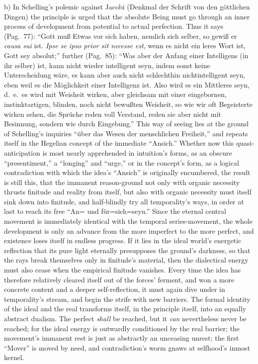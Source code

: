\documentclass[12pt]{book}
\begin{document}
b) In Schelling's polemic against Jacobi (Denkmal der Schrift von den
göttlichen Dingen) the principle is urged that the absolute Being must go
through an inner process of development from potential to actual
perfection. Thus it says (Pag.\ 77): ``Gott muß Etwas vor sich haben,
nemlich sich selber, so gewiß er \textit{causa sui} ist. \textit{Ipse se
ipso prior sit necesse est}, wenn es nicht ein leres Wort ist, Gott sey
absolut;'' further (Pag.\ 85): ``Was aber der Anfang einer Intelligens (in
ihr selber) ist, kann nicht wieder intelligent seyn, indem sonst keine
Unterscheidung wäre, es kann aber auch nicht schlechthin nichtintelligent
seyn, eben weil es die Möglichkeit einer Intelligenz ist. Also wird es ein
Mittleres seyn, d.\ e.\ es wird mit Weisheit wirken, aber gleichsam mit
einer eingebornen, instinktartigen, blinden, noch nicht bewußten Weisheit,
so wie wir oft Begeisterte wirken sehen, die Sprüche reden voll Verstand,
reden sie aber nicht mit Besinnung, sondern wie durch Eingebung.'' This way
of seeing lies at the ground of Schelling's inquiries ``über das Wesen der
menschlichen Freiheit,'' and repeats itself in the Hegelian concept of the
immediate ``Ansich.'' Whether now this quasi-anticipation is most nearly
apprehended in intuition's forms, as an obscure ``presentiment,'' a
``longing'' and ``urge,'' or in the concept's form, as a logical
contradiction with which the idea's ``Ansich'' is originally encumbered, the
result is still this, that the immanent reason-ground not only with organic
necessity thrusts finitude and reality from itself, but also with organic
necessity must itself sink down into finitude, and half-blindly try all
temporality's ways, in order at last to reach its free ``An= und
für=sich=seyn.'' Since the eternal central movement is immediately identical
with the temporal series-movement, the whole development is only an advance
from the more imperfect to the more perfect, and existence loses itself in
endless progress. If it lies in the ideal world's energetic reflection that
its pure light eternally presupposes the ground's darkness, so that the rays
break themselves only in finitude's material, then the dialectical energy
must also cease when the empirical finitude vanishes. Every time the idea
has therefore relatively cleared itself out of the forces' ferment, and won
a more concrete content and a deeper self-reflection, it must again dive
under in temporality's stream, and begin the strife with new barriers. The
formal identity of the ideal and the real transforms itself, in the
principle itself, into an equally abstract dualism. The perfect \emph{shall}
be reached, but it \emph{can} nevertheless never be reached; for the ideal
energy is outwardly conditioned by the real barrier; the movement's immanent
rest is just as abstractly an unceasing unrest; the first ``Mover'' is moved
by need, and contradiction's worm gnaws at selfhood's inmost kernel.
\end{document}
